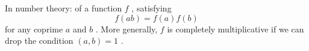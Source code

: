 In number theory: of a function  $ f $ , satisfying
 \[ f(ab)=f(a)f(b) \] for any coprime  $ a $  and  $ b $ .  More generally,  $ f $ 
is  completely multiplicative if we can drop the condition
 $ (a,b)=1 $ .

